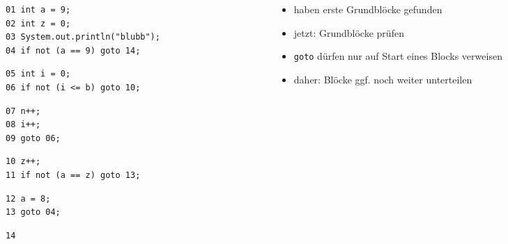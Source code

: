 \documentclass[18pt]{beamer}
\begin{document}
	\begin{frame}[fragile]
\small 
\begin{columns}
	\begin{column}{0.5\textwidth}
		\footnotesize
\begin{verbatim}
01 int a = 9;
02 int z = 0;
03 System.out.println("blubb");
04 if not (a == 9) goto 14;
\end{verbatim}
\begin{verbatim}
05 int i = 0;
06 if not (i <= b) goto 10;
\end{verbatim}
\begin{verbatim}
07 n++;
08 i++;
09 goto 06;
\end{verbatim}
\begin{verbatim}
10 z++;
11 if not (a == z) goto 13;
\end{verbatim}
\begin{verbatim}
12 a = 8;
13 goto 04;
\end{verbatim}
\begin{verbatim}
14
\end{verbatim}
	\end{column}%
	\begin{column}{0.5\textwidth}
		\begin{itemize}
			\item haben erste Grundblöcke gefunden
			\pause
			\item jetzt: Grundblöcke prüfen
			\item \texttt{goto} dürfen nur auf Start eines Blocks verweisen
			\item daher: Blöcke ggf. noch weiter unterteilen
		\end{itemize}
	\end{column}
\end{columns}	
	\end{frame}
\end{document}
